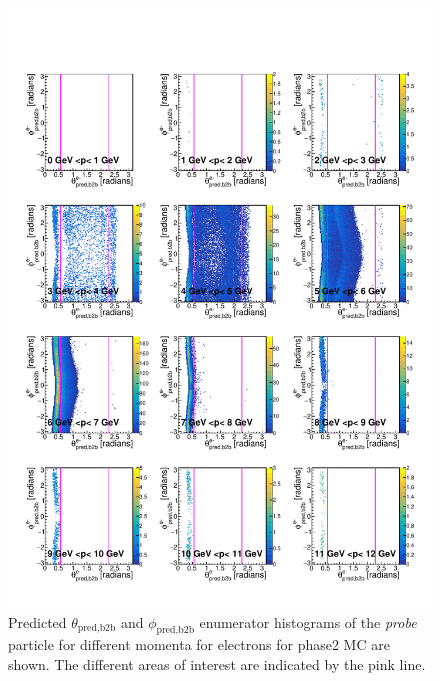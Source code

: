 \documentclass[a4paper,11pt,twosided,final,german,openbib,pdftex,listof=totoc,bibliography=totoc]{scrbook}
\begin{document}
\begin{appendix}
\begin{figure}[h!]
	\includegraphics[width=\textwidth]{Plots/master/RTPMemE_MC.pdf}
	\caption[Enumerator $\theta_{\textrm{pred,b2b}}$-$\phi_{\textrm{pred,b2b}}$ Electron Momentum Phase2 MC]{Predicted $\theta_{\textrm{pred,b2b}}$ and $\phi_{\textrm{pred,b2b}}$ enumerator histograms of the \textit{probe} particle for different momenta for electrons for phase2 MC are shown. The different areas of interest are indicated by the pink line.}
	\label{plt:RTPMemE_MC}
\end{figure}


\end{appendix}
\end{document}

